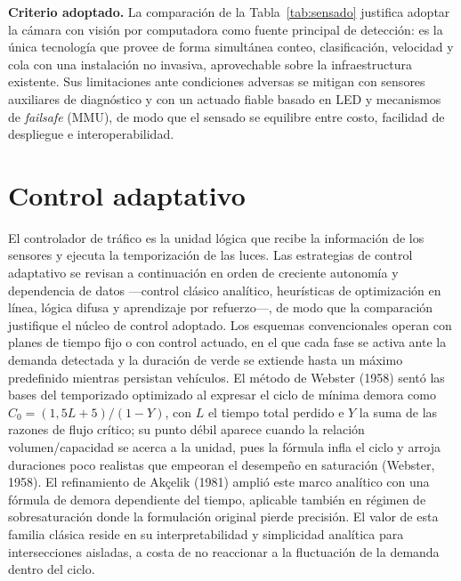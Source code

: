 \textbf{Criterio adoptado.} La comparación de la Tabla~\ref{tab:sensado} justifica adoptar la cámara con
visión por computadora como fuente principal de detección: es la única tecnología que provee de forma
simultánea conteo, clasificación, velocidad y cola con una instalación no invasiva, aprovechable sobre la
infraestructura existente. Sus limitaciones ante condiciones adversas se mitigan con sensores auxiliares de
diagnóstico y con un actuado fiable basado en LED y mecanismos de \emph{failsafe} (MMU), de modo que el
sensado se equilibre entre costo, facilidad de despliegue e interoperabilidad.

\section{Control adaptativo}\label{sec:control}

El controlador de tráfico es la unidad lógica que recibe la información de los sensores y ejecuta la
temporización de las luces. Las estrategias de control adaptativo se revisan a continuación en orden de
creciente autonomía y dependencia de datos —control clásico analítico, heurísticas de optimización en línea,
lógica difusa y aprendizaje por refuerzo—, de modo que la comparación justifique el núcleo de control
adoptado. Los esquemas convencionales operan con planes de tiempo fijo o con control
actuado, en el que cada fase se activa ante la demanda detectada y la duración de verde se extiende hasta un
máximo predefinido mientras persistan vehículos. El método de Webster (1958) sentó las bases del temporizado
optimizado al expresar el ciclo de mínima demora como $C_0 = (1{,}5L + 5)/(1 - Y)$, con $L$ el tiempo total
perdido e $Y$ la suma de las razones de flujo crítico; su punto débil aparece cuando la relación
volumen/capacidad se acerca a la unidad, pues la fórmula infla el ciclo y arroja duraciones poco realistas
que empeoran el desempeño en saturación (Webster, 1958). El refinamiento de Akçelik (1981) amplió este marco analítico con una
fórmula de demora dependiente del tiempo, aplicable también en régimen de sobresaturación donde la
formulación original pierde precisión. El valor de esta familia clásica reside en su interpretabilidad y
simplicidad analítica para intersecciones aisladas, a costa de no reaccionar a la fluctuación de la demanda
dentro del ciclo.


